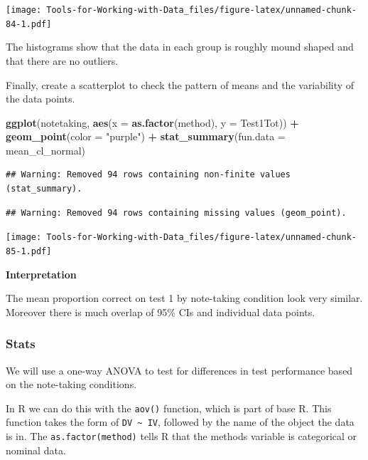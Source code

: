 \documentclass[
]{book}
\newenvironment{Shaded}{\begin{snugshade}}{\end{snugshade}}
\newcommand{\DataTypeTok}[1]{\textcolor[rgb]{0.13,0.29,0.53}{#1}}
\newcommand{\KeywordTok}[1]{\textcolor[rgb]{0.13,0.29,0.53}{\textbf{#1}}}
\newcommand{\NormalTok}[1]{#1}
\newcommand{\OperatorTok}[1]{\textcolor[rgb]{0.81,0.36,0.00}{\textbf{#1}}}
\newcommand{\StringTok}[1]{\textcolor[rgb]{0.31,0.60,0.02}{#1}}
\begin{document}
\texttt{[image: Tools-for-Working-with-Data\_files/figure-latex/unnamed-chunk-84-1.pdf]}

The histograms show that the data in each group is roughly mound shaped and that there are no outliers.

Finally, create a scatterplot to check the pattern of means and the variability of the data points.

\begin{Shaded}
\begin{Highlighting}[]
\KeywordTok{ggplot}\NormalTok{(notetaking, }\KeywordTok{aes}\NormalTok{(}\DataTypeTok{x =} \KeywordTok{as.factor}\NormalTok{(method), }\DataTypeTok{y =}\NormalTok{ Test1Tot)) }\OperatorTok{+}
\StringTok{  }\KeywordTok{geom_point}\NormalTok{(}\DataTypeTok{color =} \StringTok{"purple"}\NormalTok{) }\OperatorTok{+}
\StringTok{  }\KeywordTok{stat_summary}\NormalTok{(}\DataTypeTok{fun.data =}\NormalTok{ mean_cl_normal)}
\end{Highlighting}
\end{Shaded}

\begin{verbatim}
## Warning: Removed 94 rows containing non-finite values (stat_summary).
\end{verbatim}

\begin{verbatim}
## Warning: Removed 94 rows containing missing values (geom_point).
\end{verbatim}

\texttt{[image: Tools-for-Working-with-Data\_files/figure-latex/unnamed-chunk-85-1.pdf]}

\textbf{Interpretation}

The mean proportion correct on test 1 by note-taking condition look very similar. Moreover there is much overlap of 95\% CIs and individual data points.

\hypertarget{stats-2}{%
\subsubsection{Stats}\label{stats-2}}

We will use a one-way ANOVA to test for differences in test performance based on the note-taking conditions.

In R we can do this with the \texttt{aov()} function, which is part of base R. This function takes the form of \texttt{DV\ \textasciitilde{}\ IV}, followed by the name of the object the data is in. The \texttt{as.factor(method)} tells R that the methods variable is categorical or nominal data.
\end{document}

